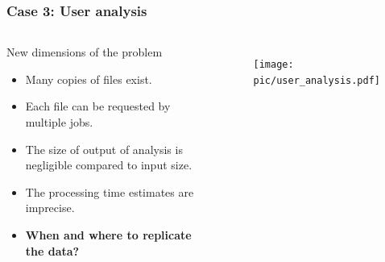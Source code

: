 \documentclass{beamer}
\begin{document}
\begin{frame}\frametitle{Case 3: User analysis }
 	\begin{columns}[c] %
 	\begin{small}
 	\vspace{-10mm}
	\begin{block}{New dimensions of the problem}
		\begin{itemize}
			\item Many copies of files exist.	
			\item Each file can be requested by multiple jobs.
			\item The size of output of analysis is negligible compared to input size.
			\item The processing time estimates  are imprecise.
			\item \textbf{When and where to replicate the data?}
		\end{itemize}
 	\end{block} 	
 	\end{small}

		\begin{figure}
			\begin{center}
			    \vspace{-15mm}
				\texttt{[image: pic/user\_analysis.pdf]}
			\end{center}
			\end{figure} 	 	
 
 	\end{columns}
\end{frame}
\end{document}
